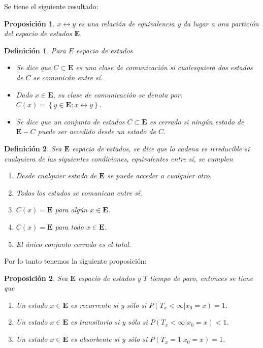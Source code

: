 \documentclass{article}
\newtheorem{Def}{Definición}[section]
\newtheorem{Prop}{Proposición}[section]
\newcommand{\Eb}{\mathbf{E}}
\numberwithin{equation}{section}
\begin{document}
Se tiene el siguiente resultado:

\begin{Prop}
$x\leftrightarrow y$ es una relaci\'on de equivalencia y da lugar a una partici\'on del espacio de estados $\Eb$.
\end{Prop}

\begin{Def}
Para $E$ espacio de estados
\begin{itemize}

\item[a)  ] Se dice que $C\subset \Eb$ es una clase de comunicaci\'on si cualesquiera dos estados de $C$ se comunic\'an entre s\'i.

\item[b)  ] Dado $x\in\Eb$, su clase de comunicaci\'on se denota por: $C\left(x\right)=\left\{y\in\Eb:x\leftrightarrow y\right\}$.

\item[c)  ] Se dice que un conjunto de estados  $C\subset \Eb$ es cerrado si ning\'un estado de $\Eb-C$ puede ser accedido desde un estado de $C$.
\end{itemize}
\end{Def}


\begin{Def}
Sea $\Eb$ espacio de estados, se dice que la cadena es irreducible si cualquiera de las siguientes condiciones, equivalentes entre s\'i,  se cumplen
\begin{enumerate}
\item[a) ] Desde cualquier estado de $\Eb$ se puede acceder a cualquier otro.

\item[b) ] Todos los estados se comunican entre s\'i.

\item[c) ] $C\left(x\right)=\Eb$ para alg\'un $x\in\Eb$.

\item[d) ] $C\left(x\right)=\Eb$ para todo $x\in\Eb$.

\item[e) ] El \'unico conjunto cerrado es el total.
\end{enumerate}
\end{Def}
Por lo tanto tenemos la siguiente proposici\'on:
\begin{Prop}  Sea $\Eb$ espacio de estados y $T$ tiempo de paro, entonces se tiene que
\begin{enumerate}
\item[a) ] Un estado $x\in\Eb$ es recurrente si y s\'olo si $P\left(T_{x}<\infty|x_{0}=x\right)=1$.

\item[b) ] Un estado $x\in\Eb$ es transitorio si y s\'olo si $P\left(T_{x}<\infty|x_{0}=x\right)<1$.

\item[c) ] Un estado $x\in\Eb$ es absorbente si y s\'olo si $P\left(T_{x}=1|x_{0}=x\right)=1$.


\end{enumerate}
\end{Prop}
\end{document}
